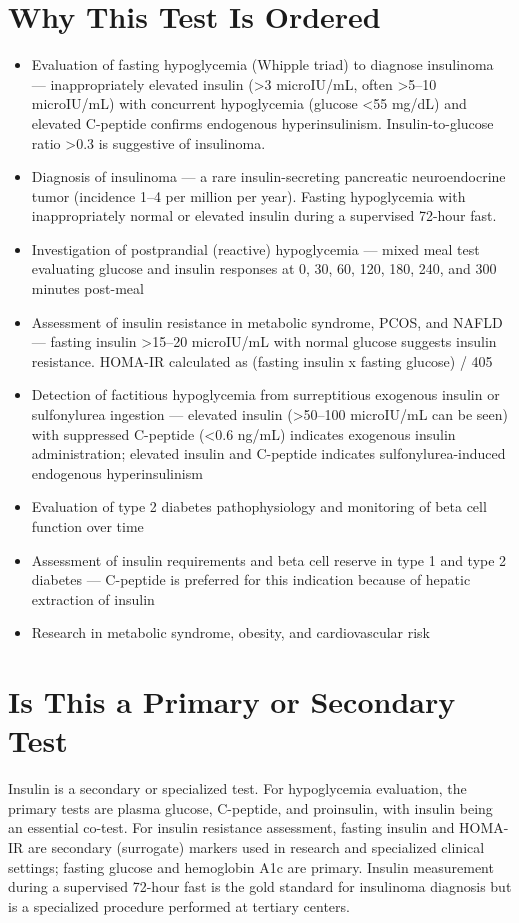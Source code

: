 \section*{Why This Test Is Ordered}
\begin{itemize}
  \item Evaluation of fasting hypoglycemia (Whipple triad) to diagnose insulinoma --- inappropriately elevated insulin (>3 microIU/mL, often >5--10 microIU/mL) with concurrent hypoglycemia (glucose <55 mg/dL) and elevated C-peptide confirms endogenous hyperinsulinism. Insulin-to-glucose ratio >0.3 is suggestive of insulinoma.
  \item Diagnosis of insulinoma --- a rare insulin-secreting pancreatic neuroendocrine tumor (incidence 1--4 per million per year). Fasting hypoglycemia with inappropriately normal or elevated insulin during a supervised 72-hour fast.
  \item Investigation of postprandial (reactive) hypoglycemia --- mixed meal test evaluating glucose and insulin responses at 0, 30, 60, 120, 180, 240, and 300 minutes post-meal
  \item Assessment of insulin resistance in metabolic syndrome, PCOS, and NAFLD --- fasting insulin >15--20 microIU/mL with normal glucose suggests insulin resistance. HOMA-IR calculated as (fasting insulin x fasting glucose) / 405
  \item Detection of factitious hypoglycemia from surreptitious exogenous insulin or sulfonylurea ingestion --- elevated insulin (>50--100 microIU/mL can be seen) with suppressed C-peptide (<0.6 ng/mL) indicates exogenous insulin administration; elevated insulin and C-peptide indicates sulfonylurea-induced endogenous hyperinsulinism
  \item Evaluation of type 2 diabetes pathophysiology and monitoring of beta cell function over time
  \item Assessment of insulin requirements and beta cell reserve in type 1 and type 2 diabetes --- C-peptide is preferred for this indication because of hepatic extraction of insulin
  \item Research in metabolic syndrome, obesity, and cardiovascular risk
\end{itemize}

\section*{Is This a Primary or Secondary Test}
Insulin is a secondary or specialized test. For hypoglycemia evaluation, the primary tests are plasma glucose, C-peptide, and proinsulin, with insulin being an essential co-test. For insulin resistance assessment, fasting insulin and HOMA-IR are secondary (surrogate) markers used in research and specialized clinical settings; fasting glucose and hemoglobin A1c are primary. Insulin measurement during a supervised 72-hour fast is the gold standard for insulinoma diagnosis but is a specialized procedure performed at tertiary centers.

